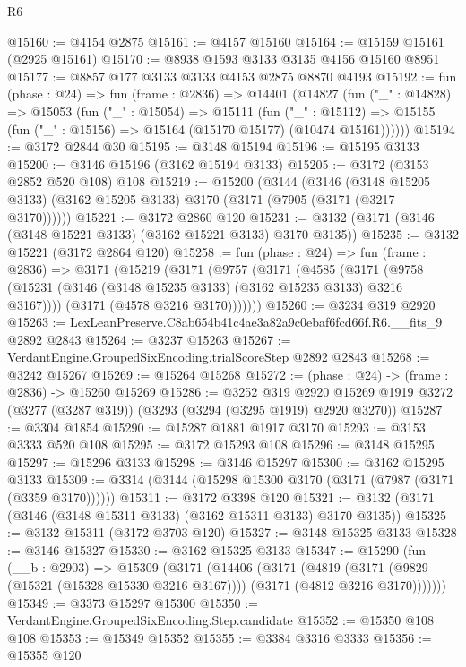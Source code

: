 \begin{lexlean}{R6}
\begin{coremodule}
@15160 := @4154 @2875
@15161 := @4157 @15160
@15164 := @15159 @15161 (@2925 @15161)
@15170 := @8938 @1593 @3133 @3135 @4156 @15160 @8951
@15177 := @8857 @177 @3133 @3133 @4153 @2875 @8870 @4193
@15192 := fun (phase : @24) =>
  fun (frame : @2836) =>
  @14401
    (@14827
      (fun ("_" : @14828) =>
      @15053
        (fun ("_" : @15054) =>
        @15111
          (fun ("_" : @15112) =>
          @15155 (fun ("_" : @15156) => @15164 (@15170 @15177) (@10474 @15161))))))
@15194 := @3172 @2844 @30
@15195 := @3148 @15194
@15196 := @15195 @3133
@15200 := @3146 @15196 (@3162 @15194 @3133)
@15205 := @3172 (@3153 @2852 @520 @108) @108
@15219 := @15200
    (@3144
      (@3146 (@3148 @15205 @3133) (@3162 @15205 @3133) @3170 (@3171 (@7905 (@3171 (@3217 @3170))))))
@15221 := @3172 @2860 @120
@15231 := @3132 (@3171 (@3146 (@3148 @15221 @3133) (@3162 @15221 @3133) @3170 @3135))
@15235 := @3132 @15221 (@3172 @2864 @120)
@15258 := fun (phase : @24) =>
  fun (frame : @2836) =>
  @3171
    (@15219
      (@3171
        (@9757
          (@3171
            (@4585
              (@3171 (@9758 (@15231 (@3146 (@3148 @15235 @3133) (@3162 @15235 @3133) @3216 @3167))))
              (@3171 (@4578 @3216 @3170)))))))
@15260 := @3234 @319 @2920
@15263 := LexLeanPreserve.C8ab654b41c4ae3a82a9c0ebaf6fcd66f.R6.__fits_9 @2892 @2843
@15264 := @3237 @15263
@15267 := VerdantEngine.GroupedSixEncoding.trialScoreStep @2892 @2843
@15268 := @3242 @15267
@15269 := @15264 @15268
@15272 := (phase : @24) -> (frame : @2836) -> @15260 @15269
@15286 := @3252
    @319
    @2920
    @15269
    @1919
    @3272
    (@3277 (@3287 @319))
    (@3293 (@3294 (@3295 @1919) @2920 @3270))
@15287 := @3304 @1854
@15290 := @15287 @1881 @1917 @3170
@15293 := @3153 @3333 @520 @108
@15295 := @3172 @15293 @108
@15296 := @3148 @15295
@15297 := @15296 @3133
@15298 := @3146 @15297
@15300 := @3162 @15295 @3133
@15309 := @3314 (@3144 (@15298 @15300 @3170 (@3171 (@7987 (@3171 (@3359 @3170))))))
@15311 := @3172 @3398 @120
@15321 := @3132 (@3171 (@3146 (@3148 @15311 @3133) (@3162 @15311 @3133) @3170 @3135))
@15325 := @3132 @15311 (@3172 @3703 @120)
@15327 := @3148 @15325 @3133
@15328 := @3146 @15327
@15330 := @3162 @15325 @3133
@15347 := @15290
    (fun (__b : @2903) =>
    @15309
      (@3171
        (@14406
          (@3171
            (@4819
              (@3171 (@9829 (@15321 (@15328 @15330 @3216 @3167))))
              (@3171 (@4812 @3216 @3170)))))))
@15349 := @3373 @15297 @15300
@15350 := VerdantEngine.GroupedSixEncoding.Step.candidate
@15352 := @15350 @108 @108
@15353 := @15349 @15352
@15355 := @3384 @3316 @3333
@15356 := @15355 @120

\end{coremodule}
\end{lexlean}
